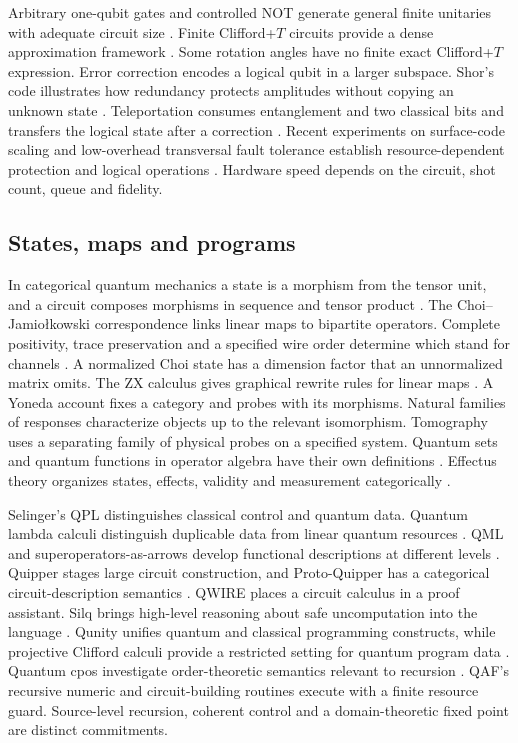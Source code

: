 Arbitrary one-qubit gates and controlled NOT generate general finite unitaries with adequate circuit size \cite{barenco}. Finite Clifford+$T$ circuits provide a dense approximation framework \cite{boykin,sk}. Some rotation angles have no finite exact Clifford+$T$ expression. Error correction encodes a logical qubit in a larger subspace. Shor's code illustrates how redundancy protects amplitudes without copying an unknown state \cite{error}. Teleportation consumes entanglement and two classical bits and transfers the logical state after a correction \cite{teleport}. Recent experiments on surface-code scaling and low-overhead transversal fault tolerance establish resource-dependent protection and logical operations \cite{threshold,universalqc}. Hardware speed depends on the circuit, shot count, queue and fidelity.

\subsection{States, maps and programs}
In categorical quantum mechanics a state is a morphism from the tensor unit, and a circuit composes morphisms in sequence and tensor product \cite{category}. The Choi--Jamio\l kowski correspondence links linear maps to bipartite operators. Complete positivity, trace preservation and a specified wire order determine which stand for channels \cite{jam,choi,stine}. A normalized Choi state has a dimension factor that an unnormalized matrix omits. The ZX calculus gives graphical rewrite rules for linear maps \cite{zx}. A Yoneda account fixes a category and probes with its morphisms. Natural families of responses characterize objects up to the relevant isomorphism. Tomography uses a separating family of physical probes on a specified system. Quantum sets and quantum functions in operator algebra have their own definitions \cite{qset}. Effectus theory organizes states, effects, validity and measurement categorically \cite{effectus}.

Selinger's QPL distinguishes classical control and quantum data. Quantum lambda calculi distinguish duplicable data from linear quantum resources \cite{qpl,lambda}. QML and superoperators-as-arrows develop functional descriptions at different levels \cite{qml,arrows}. Quipper stages large circuit construction, and Proto-Quipper has a categorical circuit-description semantics \cite{quipper,proto}. QWIRE places a circuit calculus in a proof assistant. Silq brings high-level reasoning about safe uncomputation into the language \cite{qwire,silq}. Qunity unifies quantum and classical programming constructs, while projective Clifford calculi provide a restricted setting for quantum program data \cite{qunity,lambdapc}. Quantum cpos investigate order-theoretic semantics relevant to recursion \cite{cpos}. QAF's recursive numeric and circuit-building routines execute with a finite resource guard. Source-level recursion, coherent control and a domain-theoretic fixed point are distinct commitments.

